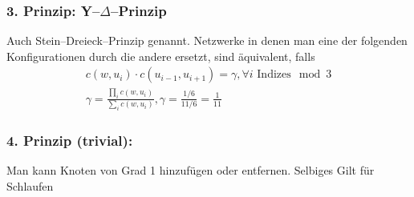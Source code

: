 \begin{beispiel}
\end{beispiel}

\subsubsection*{3. Prinzip: Y--$\Delta$--Prinzip}
Auch Stein--Dreieck--Prinzip genannt. Netzwerke in denen man eine der folgenden Konfigurationen durch die andere ersetzt, sind äquivalent, falls 
\begin{gather}
	c(w, u_i) \cdot c(u_{i-1},u_{i+1}) = \gamma, \forall i \text{ Indizes}\mod{3} \\
	\gamma = \frac{\prod\limits_{i} c(w,u_i)}{\sum\limits_{i}c(w,u_i)}, \gamma = \frac{1/6}{11/6} = \frac{1}{11}
\end{gather}

\subsubsection*{4. Prinzip (trivial):}
Man kann Knoten von Grad 1 hinzufügen oder entfernen. Selbiges Gilt für Schlaufen


\newpage



